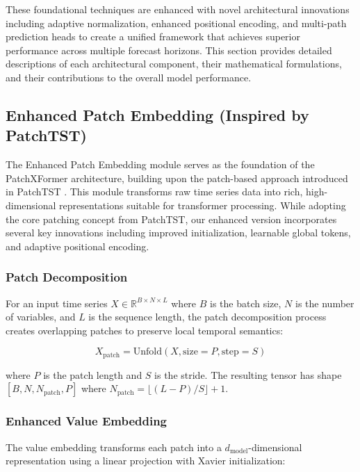 \documentclass[12pt]{uomthesis}
\begin{document}
These foundational techniques are enhanced with novel architectural innovations including adaptive normalization, enhanced positional encoding, and multi-path prediction heads to create a unified framework that achieves superior performance across multiple forecast horizons. This section provides detailed descriptions of each architectural component, their mathematical formulations, and their contributions to the overall model performance.

\subsection{Enhanced Patch Embedding (Inspired by PatchTST)}

The Enhanced Patch Embedding module serves as the foundation of the PatchXFormer architecture, building upon the patch-based approach introduced in PatchTST \cite{nie2022patchtst}. This module transforms raw time series data into rich, high-dimensional representations suitable for transformer processing. While adopting the core patching concept from PatchTST, our enhanced version incorporates several key innovations including improved initialization, learnable global tokens, and adaptive positional encoding.

\subsubsection{Patch Decomposition}

For an input time series $X \in \mathbb{R}^{B \times N \times L}$ where $B$ is the batch size, $N$ is the number of variables, and $L$ is the sequence length, the patch decomposition process creates overlapping patches to preserve local temporal semantics:

\begin{equation}
X_{\text{patch}} = \text{Unfold}(X, \text{size}=P, \text{step}=S)
\end{equation}

where $P$ is the patch length and $S$ is the stride. The resulting tensor has shape $[B, N, N_{\text{patch}}, P]$ where $N_{\text{patch}} = \lfloor (L-P)/S \rfloor + 1$.

\subsubsection{Enhanced Value Embedding}

The value embedding transforms each patch into a $d_{\text{model}}$-dimensional representation using a linear projection with Xavier initialization:
\end{document}
